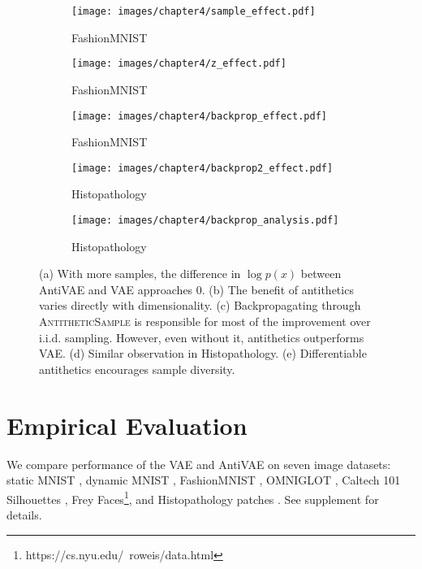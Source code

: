 \begin{figure*}[t!]
    \begin{subfigure}[b]{0.16\textwidth}
        \texttt{[image: images/chapter4/sample\_effect.pdf]}
        \caption{FashionMNIST}
    \end{subfigure}
    \begin{subfigure}[b]{0.16\textwidth}
        \texttt{[image: images/chapter4/z\_effect.pdf]}
        \caption{FashionMNIST}
    \end{subfigure}
    \begin{subfigure}[b]{0.24\textwidth}
        \texttt{[image: images/chapter4/backprop\_effect.pdf]}
        \caption{FashionMNIST}
        \label{fig:discussion:c}
    \end{subfigure}
    \begin{subfigure}[b]{0.24\textwidth}
        \texttt{[image: images/chapter4/backprop2\_effect.pdf]}
        \caption{Histopathology}
        \label{fig:discussion:d}
    \end{subfigure}
    \begin{subfigure}[b]{0.16\textwidth}
        \texttt{[image: images/chapter4/backprop\_analysis.pdf]}
        \caption{Histopathology}
        \label{fig:discussion:e}
    \end{subfigure}
    \caption{(a) With more samples, the difference in $\log p(x)$ between AntiVAE and VAE approaches 0. (b) The benefit of antithetics varies directly with dimensionality. (c) Backpropagating through \textsc{AntitheticSample} is responsible for most of the improvement over i.i.d. sampling. However, even without it, antithetics outperforms VAE. (d) Similar observation in Histopathology. (e) Differentiable antithetics encourages sample diversity.}
    \label{fig:discussion}
\end{figure*}

\section{Empirical Evaluation}
\label{sec:experiments}


We compare performance of the VAE and AntiVAE on seven image datasets: static MNIST \cite{larochelle2011neural}, dynamic MNIST \cite{lecun1998gradient}, FashionMNIST \cite{xiao2017fashion}, OMNIGLOT \cite{lake2015human}, Caltech 101 Silhouettes \cite{marlin2010inductive}, Frey Faces\footnote{https://cs.nyu.edu/~roweis/data.html}, and Histopathology patches \cite{tomczak2016improving}. See supplement for details.

